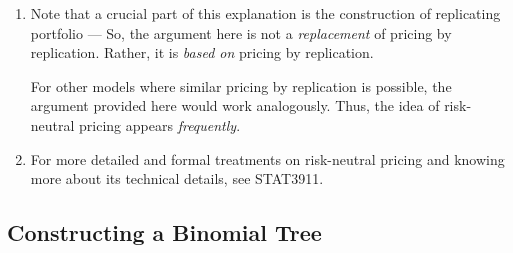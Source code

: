 \begin{enumerate}
\item Note that a crucial part of this explanation is the construction of
replicating portfolio --- So, the argument here is not a \emph{replacement} of
pricing by replication. Rather, it is \emph{based on} pricing by replication.

For other models where similar pricing by replication is possible, the argument
provided here would work analogously. Thus, the idea of risk-neutral
pricing appears \emph{frequently}.

\item For more detailed and formal treatments on risk-neutral pricing and
knowing more about its technical details, see STAT3911.
\end{enumerate}
\subsection{Constructing a Binomial Tree}
